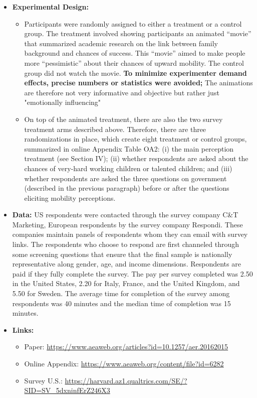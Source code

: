 \documentclass[a4paper, 12pt]{article}
\begin{document}
\begin{itemize}
\begin{itemize}
\begin{itemize}
        \end{itemize}
    \end{itemize}
    \item \textbf{Experimental Design:} 
    \begin{itemize}
        \item Participants were randomly assigned to either a treatment or a control group. The treatment involved showing participants an animated \textquotedblleft movie\textquotedblright{} that summarized academic research on the link between family background and chances of success. This \textquotedblleft movie\textquotedblright{} aimed to make people more \textquotedblleft pessimistic\textquotedblright{} about their chances of upward mobility. The control group did not watch the movie. \textbf{To minimize experimenter demand effects, precise numbers or statistics were avoided;} The animations are therefore not very informative and objective but rather just "emotionally influencing" 
        \item On top of the animated treatment, there are also the two survey treatment arms described above. Therefore, there are three randomizations in place, which create eight treatment or control groups, summarized in online Appendix Table OA2: (i) the main perception treatment (see Section IV); (ii) whether respondents are asked about the chances of very-hard working children or talented children; and (iii) whether respondents are asked the three questions on government (described in the previous paragraph) before or after the questions eliciting mobility perceptions.
    \end{itemize}
    
    \item \textbf{Data:} US respondents were contacted through the survey company C\&T Marketing, European respondents by the survey company Respondi. These companies maintain panels of respondents whom they can email with survey links. The respondents who choose to respond are first channeled through some screening questions that ensure that the final sample is nationally representative along gender, age, and income dimensions. Respondents are paid if they fully complete the survey. The pay per survey completed was 2.50 in the United States, 2.20 for Italy, France, and the United Kingdom, and 5.50 for Sweden. The average time for completion of the survey among respondents was 40 minutes and the median time of completion was 15 minutes.
    \item \textbf{Links:}
    \begin{itemize}
        \item Paper: \url{https://www.aeaweb.org/articles?id=10.1257/aer.20162015}
        \item Online Appendix: \url{https://www.aeaweb.org/content/file?id=6282}
        \item Survey U.S.: \url{https://harvard.az1.qualtrics.com/SE/?SID=SV_5dxninfErZ246X3}
    \end{itemize}
\end{itemize}
\end{document}
